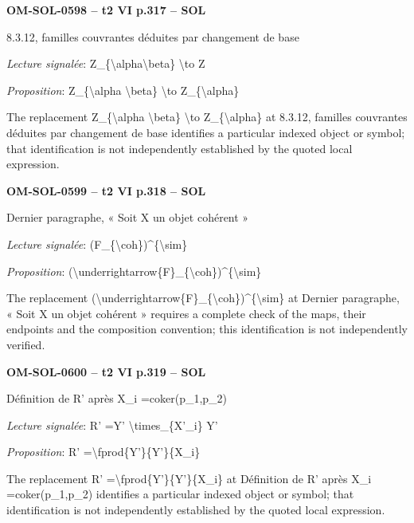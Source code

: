 \par\noindent\textbf{OM-SOL-0598 -- t2 VI p.317 -- SOL}\par
8.3.12, familles couvrantes déduites par changement de base\par
\emph{Lecture signalée}: Z\_\{\textbackslash{}alpha\textbackslash{}beta\} \textbackslash{}to Z\par
\emph{Proposition}: Z\_\{\textbackslash{}alpha \textbackslash{}beta\} \textbackslash{}to Z\_\{\textbackslash{}alpha\}\par
The replacement Z\_\{\textbackslash{}alpha \textbackslash{}beta\} \textbackslash{}to Z\_\{\textbackslash{}alpha\} at 8.3.12, familles couvrantes déduites par changement de base identifies a particular indexed object or symbol; that identification is not independently established by the quoted local expression.\par
\par\noindent\textbf{OM-SOL-0599 -- t2 VI p.318 -- SOL}\par
Dernier paragraphe, « Soit X un objet cohérent »\par
\emph{Lecture signalée}: (F\_\{\textbackslash{}coh\})\textasciicircum{}\{\textbackslash{}sim\}\par
\emph{Proposition}: (\textbackslash{}underrightarrow\{F\}\_\{\textbackslash{}coh\})\textasciicircum{}\{\textbackslash{}sim\}\par
The replacement (\textbackslash{}underrightarrow\{F\}\_\{\textbackslash{}coh\})\textasciicircum{}\{\textbackslash{}sim\} at Dernier paragraphe, « Soit X un objet cohérent » requires a complete check of the maps, their endpoints and the composition convention; this identification is not independently verified.\par
\par\noindent\textbf{OM-SOL-0600 -- t2 VI p.319 -- SOL}\par
Définition de R' après X\_i =\allowbreak  coker(p\_1,p\_2)\par
\emph{Lecture signalée}: R' =\allowbreak  Y' \textbackslash{}times\_\{X'\_i\} Y'\par
\emph{Proposition}: R' =\allowbreak  \textbackslash{}fprod\{Y'\}\{Y'\}\{X\_i\}\par
The replacement R' =\allowbreak  \textbackslash{}fprod\{Y'\}\{Y'\}\{X\_i\} at Définition de R' après X\_i =\allowbreak  coker(p\_1,p\_2) identifies a particular indexed object or symbol; that identification is not independently established by the quoted local expression.\par
